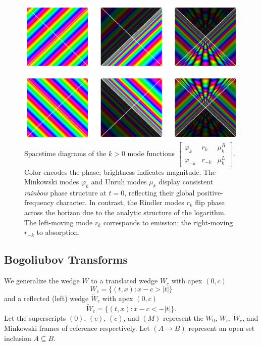 \documentclass[12pt,a4paper]{article}
\begin{document}
\begin{figure}[h]
\centering
\includegraphics[scale=0.5]{unruh_mode_rainbow.png}
\captionsetup{width=0.7\textwidth}
\caption{Spacetime diagrams of the $k>0$ mode functions $\left[\begin{array}{ccc} \varphi_k & r_k & \mu^R_k \\ \varphi_{-k} & r_{-k} & \mu^L_k \end{array} \right]$. Color encodes the phase; brightness indicates magnitude. The Minkowski modes $\varphi_k$ and Unruh modes $\mu_k$ display consistent {\it rainbow} phase structure at $t=0$, reflecting their global positive-frequency character. In contrast, the Rindler modes $r_k$ flip phase across the horizon due to the analytic structure of the logarithm. The left-moving mode $r_k$ corresponds to emission; the right-moving $r_{-k}$ to absorption.}
\label{unruh_rainbow}
\end{figure}

\subsection{Bogoliubov Transforms}
We generalize the wedge $W$ to a translated wedge $W_c$ with apex $(0,c)$
\begin{equation}
 W_c = \{(t,x) : x - c > |t|\} 
\end{equation}
and a reflected (left) wedge $\widetilde{W}_c$ with apex $(0,c)$
\begin{equation}
 \widetilde{W}_c = \{(t,x) : x - c < -|t|\}.
\end{equation}
Let the superscripts $(0)$, $(c)$, $(\widetilde{c})$, and $(M)$ represent the $W_0$, $W_c$, $\widetilde{W}_c$, and Minkowski frames of reference respectively.  Let $(A \rightarrow B)$ represent an open set inclusion $A \subseteq B$.
\end{document}

